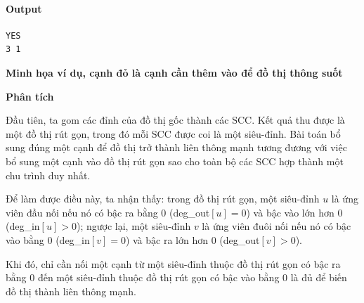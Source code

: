 \documentclass{article}
\begin{document}
\paragraph{Output}
\begin{lstlisting}
YES
3 1
\end{lstlisting}

\textbf{Minh họa ví dụ, cạnh đỏ là cạnh cần thêm vào để đồ thị thông suốt}

\begin{center}
\end{center}

\textbf{Phân tích}

Đầu tiên, ta gom các đỉnh của đồ thị gốc thành các SCC. Kết quả thu được là một đồ thị rút gọn, trong đó mỗi SCC được coi là một siêu-đỉnh. Bài toán bổ sung đúng một cạnh để đồ thị trở thành liên thông mạnh tương đương với việc bổ sung một cạnh vào đồ thị rút gọn sao cho toàn bộ các SCC hợp thành một chu trình duy nhất.

Để làm được điều này, ta nhận thấy: trong đồ thị rút gọn, một siêu-đỉnh $u$ là ứng viên đầu nối nếu nó có bậc ra bằng 0 (deg\_out$[u]=0$) và bậc vào lớn hơn 0 (deg\_in$[u] > 0$); ngược lại, một siêu-đỉnh $v$ là ứng viên đuôi nối nếu nó có bậc vào bằng 0 (deg\_in$[v]=0$) và bậc ra lớn hơn 0 (deg\_out$[v] > 0$).

Khi đó, chỉ cần nối một cạnh từ một siêu-đỉnh thuộc đồ thị rút gọn có bậc ra bằng 0 đến một siêu-đỉnh thuộc đồ thị rút gọn có bậc vào bằng 0 là đủ để biến đồ thị thành liên thông mạnh.

\end{document}
